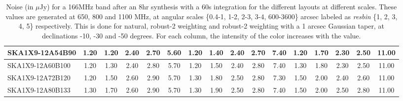\begin{table}[H]
{{\begin{tabular}{|lccccc||ccccc||ccccc|}
SKA1X9-12A54B90 & 1.20 \cellcolor{blue!18.00} & 1.20 \cellcolor{red!18.00} & 2.40 \cellcolor{green!18.00} & 2.70 \cellcolor{orange!32.00} & 5.60 \cellcolor{purple!46.00} & 1.20 \cellcolor{blue!18.00} & 1.40 \cellcolor{red!18.00} & 2.40 \cellcolor{green!39.00} & 2.70 \cellcolor{orange!39.00} & 7.40 \cellcolor{purple!60.00} & 1.20 \cellcolor{blue!18.00} & 1.70 \cellcolor{red!18.00} & 2.30 \cellcolor{green!32.00} & 2.50 \cellcolor{orange!28.50} & 11.00 \cellcolor{purple!60.00}\\ \hline 
SKA1X9-12A60B100 & 1.20 \cellcolor{blue!18.00} & 1.30 \cellcolor{red!24.00} & 2.40 \cellcolor{green!18.00} & 2.80 \cellcolor{orange!46.00} & 5.70 \cellcolor{purple!60.00} & 1.20 \cellcolor{blue!18.00} & 1.50 \cellcolor{red!26.40} & 2.40 \cellcolor{green!39.00} & 2.80 \cellcolor{orange!60.00} & 7.40 \cellcolor{purple!60.00} & 1.30 \cellcolor{blue!32.00} & 1.80 \cellcolor{red!32.00} & 2.30 \cellcolor{green!32.00} & 2.50 \cellcolor{orange!28.50} & 11.00 \cellcolor{purple!60.00}\\ \hline 
SKA1X9-12A72B120 & 1.20 \cellcolor{blue!18.00} & 1.50 \cellcolor{red!36.00} & 2.60 \cellcolor{green!60.00} & 2.90 \cellcolor{orange!60.00} & 5.70 \cellcolor{purple!60.00} & 1.30 \cellcolor{blue!28.50} & 1.80 \cellcolor{red!51.60} & 2.50 \cellcolor{green!60.00} & 2.80 \cellcolor{orange!60.00} & 7.30 \cellcolor{purple!49.50} & 1.50 \cellcolor{blue!60.00} & 2.00 \cellcolor{red!60.00} & 2.40 \cellcolor{green!46.00} & 2.60 \cellcolor{orange!39.00} & 11.00 \cellcolor{purple!60.00}\\ \hline 
SKA1X9-12A80B133 & 1.30 \cellcolor{blue!32.00} & 1.70 \cellcolor{red!48.00} & 2.60 \cellcolor{green!60.00} & 2.90 \cellcolor{orange!60.00} & 5.70 \cellcolor{purple!60.00} & 1.30 \cellcolor{blue!28.50} & 1.90 \cellcolor{red!60.00} & 2.50 \cellcolor{green!60.00} & 2.80 \cellcolor{orange!60.00} & 7.40 \cellcolor{purple!60.00} & 1.50 \cellcolor{blue!60.00} & 2.00 \cellcolor{red!60.00} & 2.50 \cellcolor{green!60.00} & 2.80 \cellcolor{orange!60.00} & 11.00 \cellcolor{purple!60.00}\\ \hline 
\end{tabular}}
\vspace{-0.300000cm}
\hspace{1cm} 

\vspace{.25cm}
\caption{Noise (in $\mu$Jy) for a 166MHz band after an 8hr synthesis with a 60s integration for the different layouts at different scales. These values are generated at 650, 800 and 1100 MHz, at angular scales \{0.4-1, 1-2, 2-3, 3-4, 600-3600\} arcsec labeled as {\it resbin} \{1, 2, 3, 4, 5\} respectively. This is done for natural, robust-2 weighting and robust-2 weighting with a 1 arcsec Gaussian taper, at declinations -10, -30 and -50 degrees. For each column, the intensity of the color increases with the value.}\label{tab:noise166}}
 \end{table}
